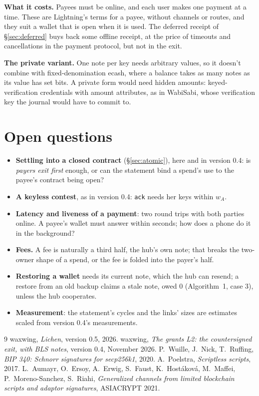 \documentclass[11pt]{article}
\theoremstyle{plain}
\theoremstyle{definition}
\newcommand{\tx}[1]{\texttt{#1}}
\begin{document}
\textbf{What it costs.} Payees must be online, and each user makes one
payment at a time. These are Lightning's terms for a payee, without
channels or routes, and they suit a wallet that is open when it is
used. The deferred receipt of \S\ref{sec:deferred} buys back some
offline receipt, at the price of timeouts and cancellations in the
payment protocol, but not in the exit.

\textbf{The private variant.} One note per key needs arbitrary values,
so it doesn't combine with fixed-denomination ecash, where a balance
takes as many notes as its value has set bits. A private form would
need hidden amounts: keyed-verification credentials with amount
attributes, as in WabiSabi, whose verification key the journal would
have to commit to.

\section{Open questions}\label{sec:open}

\begin{itemize}[nosep]
\item \textbf{Settling into a closed contract} (\S\ref{sec:atomic}),
  here and in version 0.4: is \emph{payers exit first} enough, or can
  the statement bind a spend's use to the payee's contract being open?
\item \textbf{A keyless contest}, as in version 0.4: \tx{ack} needs her
  keys within $w_A$.
\item \textbf{Latency and liveness of a payment}: two round trips with
  both parties online. A payee's wallet must answer within seconds;
  how does a phone do it in the background?
\item \textbf{Fees.} A fee is naturally a third half, the hub's own
  note; that breaks the two-owner shape of a spend, or the fee is
  folded into the payer's half.
\item \textbf{Restoring a wallet} needs its current note, which the hub
  can resend; a restore from an old backup claims a stale note, owed 0
  (Algorithm~1, case 3), unless the hub cooperates.
\item \textbf{Measurement}: the statement's cycles and the links' sizes
  are estimates scaled from version 0.4's measurements.
\end{itemize}

\begin{thebibliography}{9}
 waxwing, \emph{Lichen}, version 0.5, 2026.
 waxwing, \emph{The grants L2: the countersigned exit,
  with BLS notes}, version 0.4, November 2026.
 P.~Wuille, J.~Nick, T.~Ruffing, \emph{BIP 340: Schnorr
  signatures for secp256k1}, 2020.
 A.~Poelstra, \emph{Scriptless scripts}, 2017.
 L.~Aumayr, O.~Ersoy, A.~Erwig, S.~Faust,
  K.~Hostáková, M.~Maffei, P.~Moreno-Sanchez, S.~Riahi,
  \emph{Generalized channels from limited blockchain scripts and
  adaptor signatures}, ASIACRYPT 2021.
\end{thebibliography}
\end{document}
